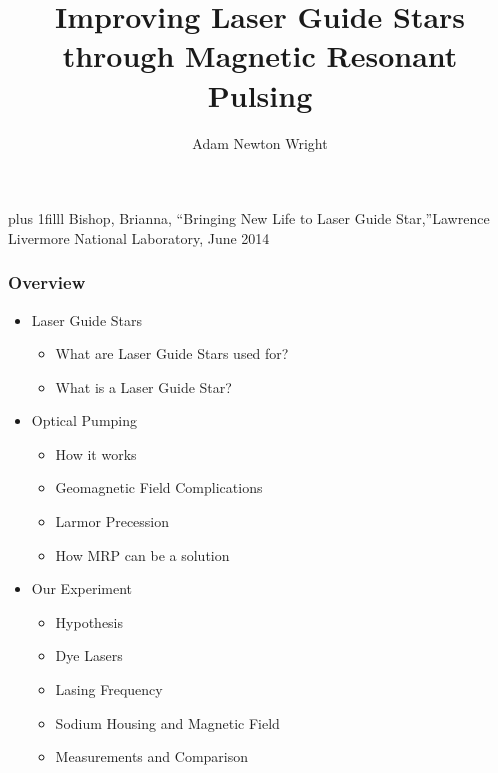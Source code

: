 \documentclass{beamer}
\title{Improving Laser Guide Stars through Magnetic Resonant Pulsing}
\author{Adam Newton Wright}
\institute{Willamette University}
\newcommand{\btVFill}{\vskip0pt plus 1filll}
\begin{document}
 {
	\begin{frame}
	  \color{white}
	  \titlepage
	  \bigskip
	  \btVFill
	  {\tiny Bishop, Brianna, ``Bringing New Life to Laser Guide Star,''Lawrence Livermore National Laboratory, June 2014}\\

	\end{frame}
  }


\begin{frame}
  \frametitle{Overview}
  \begin{itemize}
	\item Laser Guide Stars
	  \begin{itemize}
		\item{What are Laser Guide Stars used for?}
		\item{What is a Laser Guide Star?}
	  \end{itemize}
	\item Optical Pumping 
	  \begin{itemize}
		\item How it works
		\item{Geomagnetic Field Complications}
		\item{Larmor Precession}
		\item{How MRP can be a solution}
	  \end{itemize}
	\item Our Experiment
	  \begin{itemize}
		\item{Hypothesis}
		\item Dye Lasers
		\item{Lasing Frequency}
		\item{Sodium Housing and Magnetic Field}
		\item{Measurements and Comparison}
	  \end{itemize}
  \end{itemize}
\end{frame} 
\end{document}
